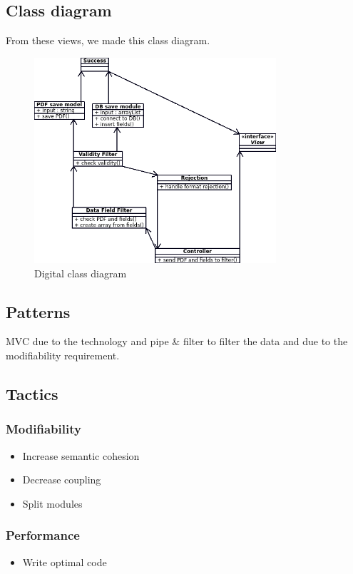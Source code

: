 \subsection{Class diagram}
From these views, we made this class diagram.
\begin{figure}[H]
\centering
\includegraphics[width=0.8\textwidth]{diagrams/class_diagram.png}
\caption{Digital class diagram}
\label{fig:class_diagram}
\end{figure}
\subsection{Patterns}
MVC due to the technology and pipe \&  filter to filter the data and due to the modifiability requirement.
\subsection{Tactics}
\subsubsection{Modifiability}
\begin{itemize}
\item Increase semantic cohesion
\item Decrease coupling
\item Split modules
\end{itemize}

\subsubsection{Performance}
\begin{itemize}
\item Write optimal code
\end{itemize}

